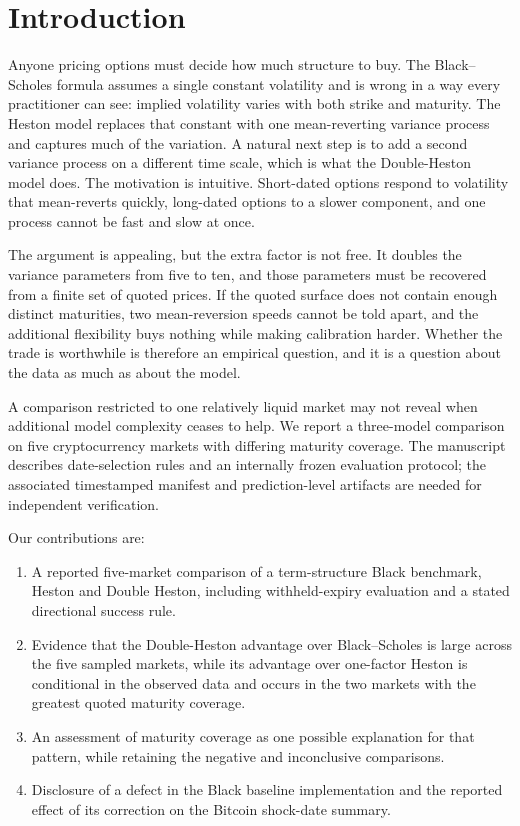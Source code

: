 \documentclass[runningheads]{llncs}
\begin{document}
\section{Introduction}
\label{sec:intro}

Anyone pricing options must decide how much structure to buy. The
Black--Scholes formula assumes a single constant volatility and is wrong
in a way every practitioner can see: implied volatility varies with both
strike and maturity. The Heston model replaces that constant with one
mean-reverting variance process and captures much of the variation. A
natural next step is to add a second variance process on a different
time scale, which is what the Double-Heston model does. The motivation
is intuitive. Short-dated options respond to volatility that
mean-reverts quickly, long-dated options to a slower component, and one
process cannot be fast and slow at once.

The argument is appealing, but the extra factor is not free. It doubles
the variance parameters from five to ten, and those parameters must be
recovered from a finite set of quoted prices. If the quoted surface does
not contain enough distinct maturities, two mean-reversion speeds cannot
be told apart, and the additional flexibility buys nothing while making
calibration harder. Whether the trade is worthwhile is therefore an
empirical question, and it is a question about the data as much as about
the model.

A comparison restricted to one relatively liquid market may not reveal
when additional model complexity ceases to help. We report a three-model
comparison on five cryptocurrency markets with differing maturity
coverage. The manuscript describes date-selection rules and an
internally frozen evaluation protocol; the associated timestamped
manifest and prediction-level artifacts are needed for independent
verification.

Our contributions are:

\begin{enumerate}
\item A reported five-market comparison of a term-structure Black
benchmark, Heston and Double Heston, including withheld-expiry
evaluation and a stated directional success rule.
\item Evidence that the Double-Heston advantage over Black--Scholes is
large across the five sampled markets, while its advantage over
one-factor Heston is conditional in the observed data and occurs in the
two markets with the greatest quoted maturity coverage.
\item An assessment of maturity coverage as one possible explanation for
that pattern, while retaining the negative and inconclusive comparisons.
\item Disclosure of a defect in the Black baseline implementation and
the reported effect of its correction on the Bitcoin shock-date summary.
\end{enumerate}
\end{document}
